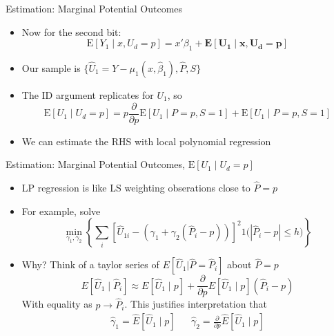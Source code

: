 \documentclass{beamer}
\begin{document}
\begin{frame}{Estimation:  Marginal Potential Outcomes }
  \begin{itemize}
  \item Now for the second bit: \begin{equation*}
      \mathrm{E}[Y_1\mid x,U_d=p]  = x'\beta_1 +  \mathbf{\mathrm{\mathbf{E}}[U_1\mid x,U_d=p]}
    \end{equation*}
\item Our sample is $\{\hat{U}_1= Y-\mu_1(x,\hat{\beta}_1), \hat{P},
  S\}$
\item The ID argument replicates for $U_1$, so 
\begin{equation*}
  \mathrm{E}[U_1\mid U_d= p] = p \frac{\partial}{\partial
    p}\mathrm{E}[U_1\mid P=p,S=1] + \mathrm{E}[U_1\mid P=p,S=1]
\end{equation*}
\item We can estimate the RHS with local polynomial regression
  \end{itemize}

\end{frame}

\begin{frame}{Estimation:  Marginal Potential Outcomes,
    $\mathrm{E}[U_1\mid U_d=p]$}
    \begin{itemize}
  \item LP regression is like LS weighting obserations close to $\hat{P}=p$
\item For example, solve
  \begin{equation*}
   \min_{\gamma_1,\gamma_2} \left\{ \sum_i\left[\hat{U}_{1i}-(\gamma_1 +
      \gamma_2(\hat{P}_i-p))\right]^2\mathrm{1}{\bigl(|\hat{P}_i - p| \le h\bigr)}\right\}
  \end{equation*}
\item Why? Think of a taylor series of $E[\hat{U}_{1}|
 \hat{P}=\hat{P}_i]$
  about $\hat{P} = p$
  \begin{equation*}
    E[\hat{U}_{1}\mid \hat{P}_i] \approx E[\hat{U}_{1}\mid p] +
    \frac{\partial}{\partial p} E[\hat{U}_{1}\mid p] (\hat{P}_i-p)
  \end{equation*}
With equality as $p \rightarrow \hat{P}_i$. This justifies
interpretation that
\begin{eqnarray*}
  \hat{\gamma}_1 = \hat{E}[\hat{U}_{1}\mid p] & & \hat{\gamma}_2 = \frac{\partial}{\partial p} \hat{E}[\hat{U}_{1}\mid p]
\end{eqnarray*}
  \end{itemize}
\end{frame}
\end{document}
